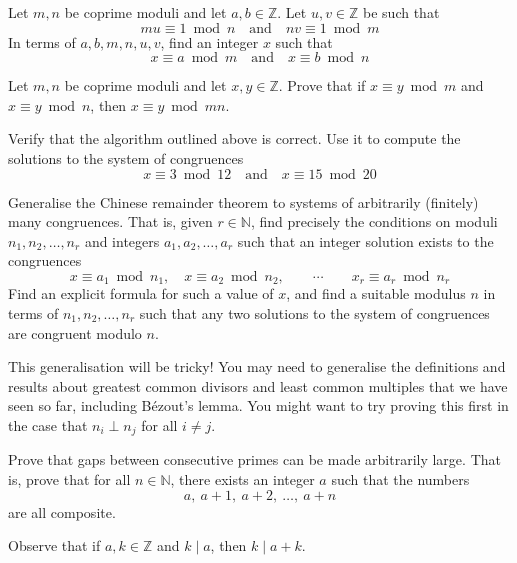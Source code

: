 \begin{exercise}
\label{exCRTExistence}
Let $m,n$ be coprime moduli and let $a,b \in \mathbb{Z}$. Let $u,v \in \mathbb{Z}$ be such that
\[ mu \equiv 1 \bmod n \quad \text{and} \quad nv \equiv 1 \bmod m \]
In terms of $a,b,m,n,u,v$, find an integer $x$ such that
\[ x \equiv a \bmod m \quad \text{and} \quad x \equiv b \bmod n \]
\end{exercise}

\begin{exercise}
\label{exCRTUniqueness}
Let $m,n$ be coprime moduli and let $x,y \in \mathbb{Z}$. Prove that if $x \equiv y \bmod m$ and $x \equiv y \bmod n$, then $x \equiv y \bmod{mn}$.
\end{exercise}


\begin{exercise}
\label{exCRTAlgorithm}
Verify that the algorithm outlined above is correct. Use it to compute the solutions to the system of congruences
\[ x \equiv 3 \bmod{12} \quad \text{and} \quad x \equiv 15 \bmod{20} \]
\end{exercise}

\begin{oexercise}
\label{exGeneralisedCRT}
Generalise the Chinese remainder theorem to systems of arbitrarily (finitely) many congruences. That is, given $r \in \mathbb{N}$, find precisely the conditions on moduli $n_1,n_2,\dots,n_r$ and integers $a_1,a_2,\dots,a_r$ such that an integer solution exists to the congruences
\[ x \equiv a_1 \bmod{n_1}, \quad x \equiv a_2 \bmod{n_2}, \qquad \cdots \qquad x_r \equiv a_r \bmod{n_r} \]
Find an explicit formula for such a value of $x$, and find a suitable modulus $n$ in terms of $n_1,n_2,\dots,n_r$ such that any two solutions to the system of congruences are congruent modulo $n$.
\begin{backhint}
This generalisation will be tricky! You may need to generalise the definitions and results about greatest common divisors and least common multiples that we have seen so far, including B\'{e}zout's lemma. You might want to try proving this first in the case that $n_i \perp n_j$ for all $i \ne j$.
\end{backhint}
\end{oexercise}

\begin{exercise}
\label{exGapsBetweenPrimesLarge}
Prove that gaps between consecutive primes can be made arbitrarily large. That is, prove that for all $n \in \mathbb{N}$, there exists an integer $a$ such that the numbers
\[ a,\ a+1,\ a+2,\ \dots,\ a+n \]
are all composite.
\begin{backhint}
Observe that if $a,k \in \mathbb{Z}$ and $k \mid a$, then $k \mid a+k$.
\end{backhint}
\end{exercise}


